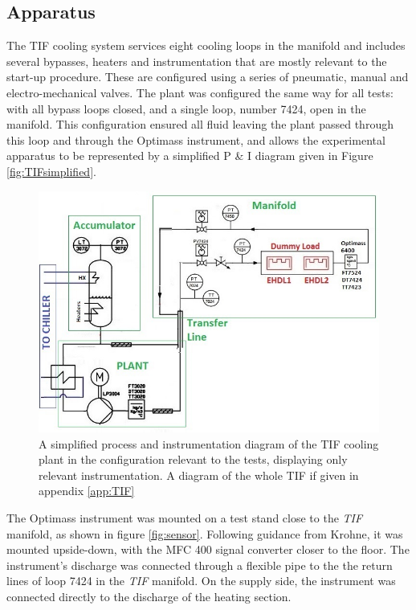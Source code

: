 \documentclass{report}
\begin{document}
\subsection{Apparatus}
The TIF cooling system services eight cooling loops in the manifold and includes several bypasses, heaters and instrumentation that are mostly relevant to the  start-up procedure. These are configured using a series of pneumatic, manual and electro-mechanical valves. 
The plant was configured the same way for all tests: with all bypass loops closed, and a single loop, number 7424, open in the manifold. This configuration ensured all fluid leaving the plant passed through this loop and through the Optimass instrument, and allows the experimental apparatus to be represented by a simplified P \& I diagram given in Figure \ref{fig:TIFsimplified}.
\begin{figure}
\includegraphics[width=\textwidth]{TIFsimplified.jpg}
\caption{A simplified process and instrumentation diagram of the TIF cooling plant in the configuration relevant to the tests, displaying only relevant instrumentation. A diagram of the whole TIF if given in appendix \ref{app:TIF}}
\label{fig:TIfsimplified}
\end{figure}
The Optimass instrument was mounted on a test stand close to the \textit{TIF} manifold, as shown in figure \ref{fig:sensor}. Following guidance from Krohne, it was mounted upside-down, with the MFC 400 signal converter closer to the floor. The instrument's discharge was connected through a flexible pipe to the the return lines of loop 7424 in the \textit{TIF} manifold. On the supply side, the instrument was connected directly to the discharge of the heating section. 
\end{document}
